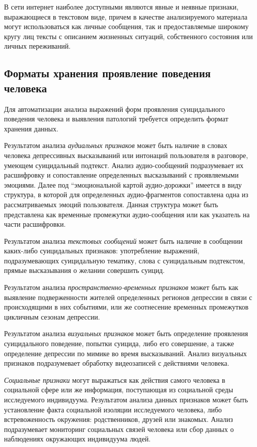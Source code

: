 В сети интернет наиболее доступными являются явные и неявные признаки, выражающиеся в текстовом виде, причем в качестве анализируемого материала могут использоваться как личные сообщения, так и предоставляемые широкому кругу лиц тексты с описанием жизненных ситуаций, собственного состояния или личных переживаний.

\subsection{Форматы хранения проявление поведения человека}

Для автоматизации анализа выражений форм проявления суицидального поведения человека и выявления патологий требуется определить формат хранения данных.

Результатом анализа \textit{аудиальных признаков} может быть наличие в словах человека депрессивных высказываний или интонаций пользователя в разговоре, умеющем суицидальный подтекст. Анализ аудио-сообщений подразумевает их расшифровку и сопоставление определенных высказываний с проявляемыми эмоциями. Далее под ``эмоциональной картой аудио-дорожки'' имеется в виду структура, в которой для определенных аудио-фрагментов сопоставлена одна из рассматриваемых эмоций пользователя. Данная структура может быть представлена как временные промежутки аудио-сообщения или как указатель на части расшифровки. 

Результатом анализа  \textit{текстовых сообщений} может быть наличие в сообщении каких-либо суицидальных признаков: употребление выражений, подразумевающих суицидальную тематику, слова с суицидальным подтекстом, прямые высказывания о желании совершить суицид.

Результатом анализа \textit{пространственно-временных признаков} может быть как выявление подверженности жителей определенных регионов депрессии в связи с происходящими в них событиями, или же соотнесение временных промежутков цикличным сезонам депрессии.

Результатом анализа \textit{визуальных признаков} может быть определение проявления суицидального поведение, попытки суицида, либо его совершение, а также определение депрессии по мимике во время высказываний. Анализ визуальных признаков подразумевает обработку видеозаписей с действиями человека.

\textit{Социальные признаки} могут выражаться как действия самого человека в социальной сфере или же информация, поступающая из социальной среды исследуемого индивидуума. Результатом анализа данных признаков может быть установление факта социальной изоляции исследуемого человека, либо встревоженность окружения: родственников, друзей или знакомых. Анализ подразумевает мониторинг социальных связей человека или сбор данных о наблюдениях окружающих индивидуума людей.

